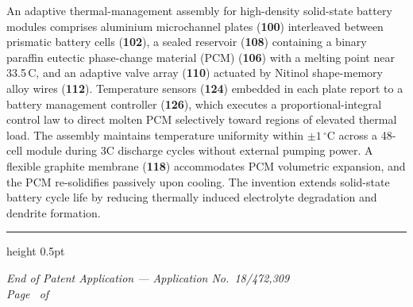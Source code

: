 \documentclass[12pt,letterpaper]{article}
\begin{document}
An adaptive thermal-management assembly for high-density solid-state battery modules
comprises aluminium microchannel plates (\textbf{100}) interleaved between prismatic
battery cells (\textbf{102}), a sealed reservoir (\textbf{108}) containing a binary paraffin
eutectic phase-change material (PCM) (\textbf{106}) with a melting point near
33.5\,\textdegree C, and an adaptive valve array (\textbf{110}) actuated by Nitinol
shape-memory alloy wires (\textbf{112}). Temperature sensors (\textbf{124}) embedded in each
plate report to a battery management controller (\textbf{126}), which executes a
proportional-integral control law to direct molten PCM selectively toward regions of
elevated thermal load. The assembly maintains temperature uniformity within
$\pm 1\,^{\circ}$C across a 48-cell module during 3C discharge cycles without external
pumping power. A flexible graphite membrane (\textbf{118}) accommodates PCM volumetric
expansion, and the PCM re-solidifies passively upon cooling. The invention extends
solid-state battery cycle life by reducing thermally induced electrolyte degradation and
dendrite formation.

\vspace{20pt}
{\color{colrule}\hrule height 0.5pt}
\vspace{6pt}
{\centering\small\color{muted}
  \textit{End of Patent Application --- Application No.~18/472,309}\\[2pt]
  \textit{Page \thepage\ of \pageref{LastPage}}
\par}
\end{document}
